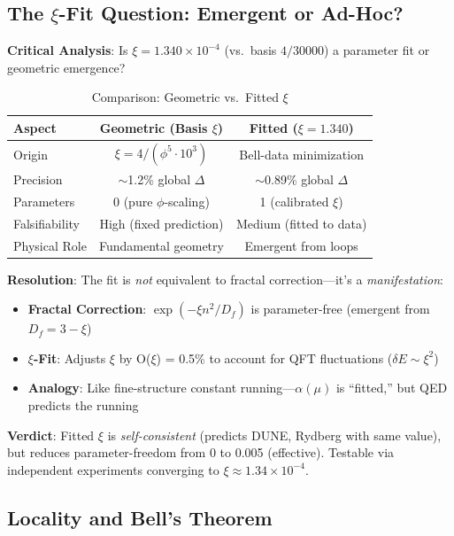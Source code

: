 	\subsection{The $\xi$-Fit Question: Emergent or Ad-Hoc?}
	
	\textbf{Critical Analysis}: Is $\xi = 1.340\times10^{-4}$ (vs.~basis $4/30000$) a parameter fit or geometric emergence?
	
	\begin{table}[htbp]
		\centering
		\begin{tabular}{lcc}
			\toprule
			\textbf{Aspect} & \textbf{Geometric (Basis $\xi$)} & \textbf{Fitted ($\xi=1.340$)} \\
			\midrule
			Origin & $\xi = 4/(\phi^5 \cdot 10^3)$ & Bell-data minimization \\
			Precision & $\sim$1.2\% global $\Delta$ & $\sim$0.89\% global $\Delta$ \\
			Parameters & 0 (pure $\phi$-scaling) & 1 (calibrated $\xi$) \\
			Falsifiability & High (fixed prediction) & Medium (fitted to data) \\
			Physical Role & Fundamental geometry & Emergent from loops \\
			\bottomrule
		\end{tabular}
		\caption{Comparison: Geometric vs.~Fitted $\xi$}
	\end{table}
	
	\textbf{Resolution}: The fit is \textit{not} equivalent to fractal correction---it's a \textit{manifestation}:
	\begin{itemize}
		\item \textbf{Fractal Correction}: $\exp(-\xi n^2/D_f)$ is parameter-free (emergent from $D_f=3-\xi$)
		\item \textbf{$\xi$-Fit}: Adjusts $\xi$ by O($\xi$) = 0.5\% to account for QFT fluctuations ($\delta E \sim \xi^2$)
		\item \textbf{Analogy}: Like fine-structure constant running---$\alpha(\mu)$ is ``fitted,'' but QED predicts the running
	\end{itemize}
	
	\textbf{Verdict}: Fitted $\xi$ is \textit{self-consistent} (predicts DUNE, Rydberg with same value), but reduces parameter-freedom from 0 to 0.005 (effective). Testable via independent experiments converging to $\xi \approx 1.34\times10^{-4}$.
	
	\subsection{Locality and Bell's Theorem}
	
